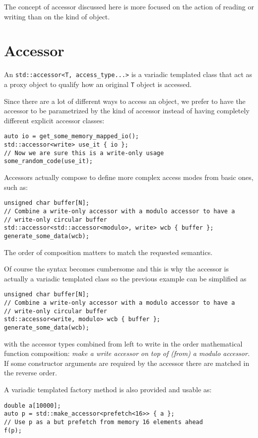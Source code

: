 \documentclass[a4paper]{article}
\begin{document}
The concept of accessor discussed here is more focused on the action
of reading or writing than on the kind of object.


\section{Accessor}
\label{sec:accessor}

An \lstinline|std::accessor<T, access_type...>| is a variadic
templated class that act as a proxy object to qualify how an original
\lstinline|T| object is accessed.

Since there are a lot of different ways to access an object, we prefer
to have the accessor to be parametrized by the kind of accessor
instead of having completely different explicit accessor classes:

\begin{lstlisting}
auto io = get_some_memory_mapped_io();
std::accessor<write> use_it { io };
// Now we are sure this is a write-only usage
some_random_code(use_it);
\end{lstlisting}

Accessors actually compose to define more complex access modes from
basic ones, such as:
\begin{lstlisting}
unsigned char buffer[N];
// Combine a write-only accessor with a modulo accessor to have a
// write-only circular buffer
std::accessor<std::accessor<modulo>, write> wcb { buffer };
generate_some_data(wcb);
\end{lstlisting}
The order of composition matters to match the requested semantics.

Of course the syntax becomes cumbersome and this is why the accessor
is actually a variadic templated class so the previous example can be
simplified as
\begin{lstlisting}
unsigned char buffer[N];
// Combine a write-only accessor with a modulo accessor to have a
// write-only circular buffer
std::accessor<write, modulo> wcb { buffer };
generate_some_data(wcb);
\end{lstlisting}
with the accessor types combined from left to write in the order
mathematical function composition: \emph{make a write accessor on top
  of (from) a modulo accessor.} If some constructor arguments are
required by the accessor there are matched in the reverse order.

A variadic templated factory method is also provided and usable as:
\begin{lstlisting}
double a[10000];
auto p = std::make_accessor<prefetch<16>> { a };
// Use p as a but prefetch from memory 16 elements ahead
f(p);
\end{lstlisting}
\end{document}
